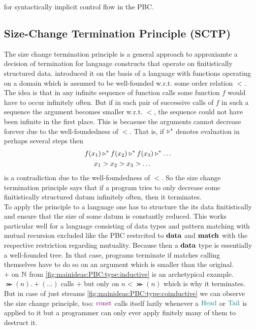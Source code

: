 for syntactically implicit control flow in the PBC.

\subsection{Size-Change Termination Principle (SCTP)}
\label{sec:mainideas:sctp}

The size change termination principle is a general approach to approxiamte a decision of termination for language constructs that operate on finitistically structured data.
\cite{lee + jones + ben-amran} introduced it on the basis of a language with functions operating on a domain which is assumed to be well-founded w.r.t. some order relation $<$.
The idea is that in any infinite sequence of function calls some function $f$ would have to occur infinitely often.
But if in each pair of successive calls of $f$ in such a sequence the argument becomes smaller w.r.t. $<$, the sequence could not have been infinite in the first place.
This is becasuse the arguments cannot decrease forever due to the well-foundedness of $<$.
That is, if $\triangleright^{\ast}$ denotes evaluation in perhaps several steps then
\begin{align*}
  f(x_{1})
  &\triangleright^{\ast}
  f(x_{2})
  \triangleright^{\ast}
  f(x_{3})
  \triangleright^{\ast}
  \ldots
  \\
  x_{1}
  &>
  x_{2}
  >
  x_{3}
  >
  \ldots
\end{align*}
is a contradiction due to the well-foundedness of $<$.
So the size change termination principle says that if a program tries to only decrease some finitistically structured datum infinitely often, then it terminates.
\\
To apply the principle to a language one has to structure the its data finitistically and ensure that the size of some datum is constantly reduced.
This works particular well for a language consisting of data types and pattern matching with mutual recursion excluded like the PBC restrcited to $\mathbf{data}$ and $\mathbf{match}$ with the respective restriction regarding mutuality.
Because then a $\mathbf{data}$ type is essentially a well-founded tree.
In that case, programs terminate if matches calling themselves have to do so on an argument which is smaller than the original.
\\
$\plus$ on $\Nat$ from \cref{fig:mainideas:PBC:type:inductive} is an archetypical example.
$\Succ(n).\plus(\ldots)$ calls $\plus$ but only on $n < \Succ(n)$ which is why it terminates.
\\
But in case of just streams \cref{fig:mainideas:PBC:type:coinductive} we can observe the size change principle, too: $\const$ calls itself lazily whenever a $\Head$ or $\Tail$ is applied to it but a programmer can only ever apply finitely many of them to destruct it.
